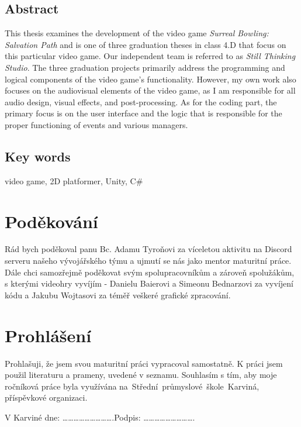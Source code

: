 \documentclass[12pt]{report}
\begin{document}
\section*{Abstract}
This thesis examines the development of the video game \emph{Surreal Bowling: Salvation Path} and is one of three graduation theses in class 4.D that focus on this particular video game. Our independent team is referred to as \emph{Still Thinking Studio}. The three graduation projects primarily address the programming and logical components of the video game's functionality. However, my own work also focuses on the audiovisual elements of the video game, as I am responsible for all audio design, visual effects, and post-processing. As for the coding part, the primary focus is on the user interface and the logic that is responsible for the proper functioning of events and various managers.

\section*{Key words}
video game, 2D platformer, Unity, C\#

\chapter*{Poděkování}
Rád bych poděkoval panu Bc. Adamu Tyroňovi za víceletou aktivitu na Discord serveru našeho vývojářského týmu a ujmutí se nás jako mentor maturitní práce. Dále chci samozřejmě poděkovat svým spolupracovníkům a zároveň spolužákům, s kterými videohry vyvíjím - Danielu Baierovi a Simeonu Bednarzovi za vyvíjení kódu a Jakubu Wojtasovi za téměř veškeré grafické zpracování.


\chapter*{Prohlášení}
Prohlašuji, že jsem svou maturitní práci vypracoval samostatně. K práci jsem použil literaturu a prameny, uvedené v seznamu. Souhlasím s tím, aby moje ročníková práce byla využívána na~Střední~průmyslové~škole~Karviná, příspěvkové organizaci.

\vspace{2\baselineskip}

\noindent V Karviné dne: ……………………….\hfill Podpis: ………………………. 

\tableofcontents








\listoffigures

\printbibliography
\end{document}
